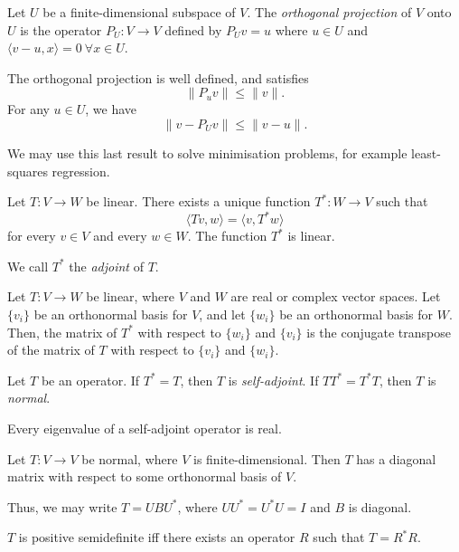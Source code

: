 \begin{defn}
  Let $U$ be a finite-dimensional subspace of $V$. The \emph{orthogonal
  projection} of $V$ onto $U$ is the operator $P_U:V\to V$ defined by $P_U v=u$
  where $u\in U$ and $\langle v-u,x\rangle=0\ \forall x\in U$.
\end{defn}
\begin{prop}
  The orthogonal projection is well defined, and satisfies
  \[\|P_u v\|\le \|v\|.\] For any $u\in U$, we have
  \[\|v-P_U v\|\le \|v-u\|.\]
\end{prop}
\begin{rem}
  We may use this last result to solve minimisation problems, for example
  least-squares regression.
\end{rem}
\begin{prop}
  Let $T:V\to W$ be linear. There exists a unique function $T^*:W\to V$ such
  that
  \[\langle Tv,w\rangle=\langle v,T^* w\rangle\] for every $v\in V$ and every
  $w\in W$. The function $T^*$ is linear.
\end{prop}
\begin{defn}
  We call $T^*$ the \emph{adjoint} of $T$.
\end{defn}
\begin{prop}
  Let $T:V\to W$ be linear, where $V$ and $W$ are real or complex vector spaces.
  Let $\{v_i\}$ be an orthonormal basis for $V$, and
  let $\{w_i\}$ be an orthonormal basis for $W$. Then, the matrix of $T^*$ with
  respect to $\{w_i\}$ and $\{v_i\}$ is the conjugate transpose of the matrix of
  $T$ with respect to $\{v_i\}$ and $\{w_i\}$.
\end{prop}
\begin{defn}
  Let $T$ be an operator. If $T^*=T$, then $T$ is \emph{self-adjoint}. If
  $TT^*=T^* T$, then $T$ is \emph{normal}.
\end{defn}
\begin{prop}
  Every eigenvalue of a self-adjoint operator is real.
\end{prop}
\begin{thm}
  Let $T:V\to V$ be normal, where $V$ is finite-dimensional. Then
  $T$ has a diagonal matrix with respect to some orthonormal basis of $V$.
\end{thm}
\begin{rem}
  Thus, we may write $T=UBU^*$, where $UU^*=U^*U=I$ and $B$ is diagonal.
\end{rem}
\begin{prop}
  $T$ is positive semidefinite iff there exists an operator $R$ such that $T=R^*R$.
\end{prop}
